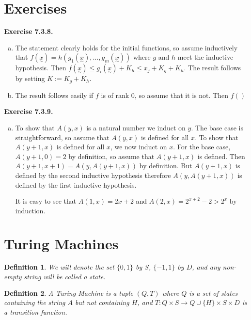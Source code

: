 \documentclass[leqno]{article}
\newtheorem{definition}{Definition}[section]
\newcommand{\set}[1]{\{#1\}}
\newcommand{\exc}[1]{\textbf{Exercise #1.}}
\newcommand{\utilde}[1]{\underset{\sim}{#1}}
\begin{document}
\section{Exercises}

\exc{7.3.8}
\begin{enumerate}[(a)]
    \item The statement clearly holds for the initial functions, so assume inductively that $f(\utilde{x}) = h(g_1(\utilde{x}), \dots, g_m(\utilde{x}))$ where $g$ and $h$ meet the inductive hypothesis. Then $f(\utilde{x}) \leq g_i(\utilde{x}) + K_h \leq x_j + K_g + K_h$. The result follows by setting $K := K_g + K_h$.
    
    \item The result follows easily if $f$ is of rank $0$, so assume that it is not. Then $f()$
\end{enumerate}

\exc{7.3.9}
\begin{enumerate}[(a)]
    \item To show that $A(y, x)$ is a natural number we induct on $y$. The base case is straightforward, so assume that $A(y, x)$ is defined for all $x$. To show that $A(y+1, x)$ is defined for all $x$, we now induct on $x$. For the base case, $A(y+1, 0) = 2$ by definition, so assume that $A(y+1, x)$ is defined. Then $A(y+1, x+1) = A(y, A(y+1, x))$ by definition. But $A(y+1, x)$ is defined by the second inductive hypothesis therefore $A(y, A(y+1, x))$ is defined by the first inductive hypothesis.
    
    It is easy to see that $A(1, x) = 2x + 2$ and $A(2, x) = 2^{x+2}-2 > 2^x$ by induction.
\end{enumerate}


\section{Turing Machines}

\begin{definition}
  We will denote the set $\set{0, 1}$ by $S$, $\set{-1, 1}$ by $D$, and any non-empty string will be called a state.
\end{definition}

\begin{definition}
  A Turing Machine is a tuple $(Q, T)$ where $Q$ is a set of states containing the string $A$ but not containing $H$, and $T: Q \times S \to Q \cup \set{H} \times S \times D$ is a transition function.
\end{definition}
\end{document}
